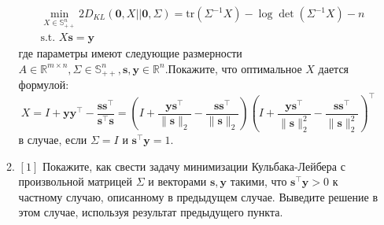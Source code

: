\documentclass{article}
\begin{document}
\begin{enumerate}
\begin{enumerate}[label=\alph*)]
     \begin{equation*}
         \begin{aligned}
             &\min_{X\in\mathbb{S}^n_{++}} 2D_{KL}(\mathbf{0},X||\mathbf{0}, \Sigma)=\text{tr}\left(\Sigma^{-1}X\right)-\log\det \left(\Sigma^{-1}X\right)-n\\
               &\text{s.t. } X\mathbf{s}=\mathbf{y}
         \end{aligned}
     \end{equation*}
         где параметры имеют следующие размерности $A\in\mathbb{R}^{m\times n},\Sigma\in\mathbb{S}^n_{++}, \mathbf{s},\mathbf{y}\in\mathbb{R}^n$.Покажите, что оптимальное $X$ дается формулой:
    $$X=I+\mathbf{y}\mathbf{y}^\top -\frac{\mathbf{s}\mathbf{s}^\top}{\mathbf{s}^\top\mathbf{s}}=\left(I+\frac{\mathbf{y}\mathbf{s}^\top}{\|\mathbf{s}\|_2}-\frac{\mathbf{s}\mathbf{s}^\top}{\|\mathbf{s}\|_2}\right)\left(I+\frac{\mathbf{y}\mathbf{s}^\top}{\|\mathbf{s}\|_2^2}-\frac{\mathbf{s}\mathbf{s}^\top}{\|\mathbf{s}\|_2^2}\right)^\top$$
    в случае, если $\Sigma=I$ и $\mathbf{s}^\top \mathbf{y}=1$.
    
    \item $[1]$ Покажите, как свести задачу минимизации Кульбака-Лейбера с произвольной матрицей $\Sigma$ и векторами $\mathbf{s},\mathbf{y}$ такими, что $\mathbf{s}^\top\mathbf{y}>0$ к частному случаю, описанному в предыдущем случае. Выведите решение в этом случае, используя результат предыдущего пункта.
     \end{enumerate}

\end{enumerate}
\end{document}

